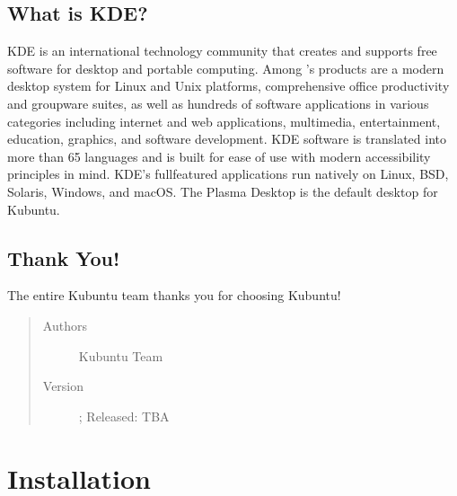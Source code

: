 \documentclass[letterpaper,10pt,english]{sphinxmanual}
\begin{document}
\section{What is KDE?}
\label{\detokenize{welcome:what-is-kde}}
\sphinxAtStartPar
KDE is an international technology community that creates and supports free software for desktop and portable computing. Among ’s products are a modern desktop system for Linux and Unix platforms, comprehensive office productivity and groupware suites, as well as hundreds of software applications in various categories including internet and web applications, multimedia, entertainment, education, graphics, and software development. KDE software is translated into more than 65 languages and is built for ease of use with modern accessibility principles in mind. KDE’s full\sphinxhyphen{}featured applications run natively on Linux, BSD, Solaris, Windows, and macOS. The Plasma Desktop is the default desktop for Kubuntu.


\section{Thank You!}
\label{\detokenize{welcome:thank-you}}
\sphinxAtStartPar
The entire Kubuntu team thanks you for choosing Kubuntu!
\begin{quote}\begin{description}
\item[{Authors}] \leavevmode
\sphinxAtStartPar
Kubuntu Team

\item[{Version}] \leavevmode
{} ; Released: TBA

\end{description}\end{quote}


\chapter{Installation}
\label{\detokenize{docs/installation:installation}}\label{\detokenize{docs/installation::doc}}
\end{document}
